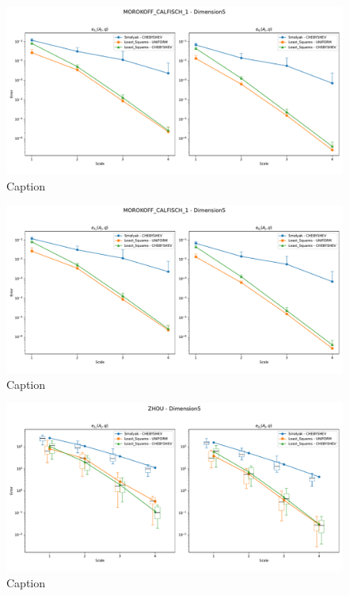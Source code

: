 \documentclass[12pt, oneside]{amsart}
\theoremstyle{definition}
\theoremstyle{remark}
\numberwithin{equation}{section}
\begin{document}
\begin{figure}[H]
	\centering
	\includegraphics[width=\linewidth]{figures/morokoff_calfisch1/distro_dim5_scale4.pdf}
	\caption{Caption}
	\label{fig:morokoff_calfisch1_distribution_dim5_scale4}
\end{figure}

\begin{figure}[H]
	\centering
	\includegraphics[width=\linewidth]{figures/morokoff_calfisch1/distro_dim5_scale4.pdf}
	\caption{Caption}
	\label{fig:morokoff_calfisch2_distribution_dim5_scale4}
\end{figure}

\begin{figure}[H] %
	\centering
	\includegraphics[width=\linewidth]{figures/zhou/distro_dim5_scale4.pdf}
	\caption{Caption}
	\label{fig:zhou_distribution_dim5_scale4}
\end{figure}
\end{document}
